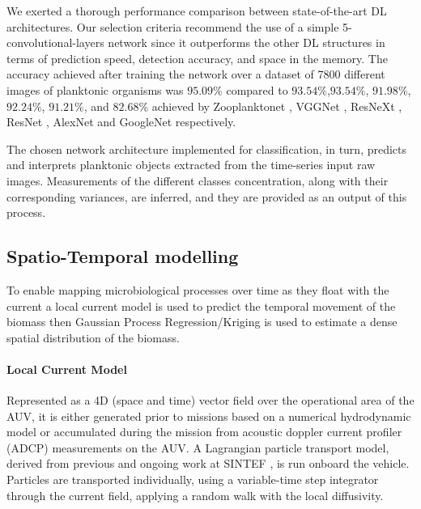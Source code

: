 \documentclass[conference]{IEEEtran}
\begin{document}
We exerted a thorough performance comparison between state-of-the-art
DL architectures. Our selection criteria recommend the use of a simple
5-convolutional-layers network since it outperforms the other DL
structures in terms of prediction speed, detection accuracy, and space
in the memory. The accuracy achieved after training the network over a
dataset of 7800 different images of planktonic organisms was $95.09\%$
compared to $93.54\%$,$93.54\%$, $91.98\%$, $92.24\%$, $91.21\%$, and
$82.68\%$ achieved by Zooplanktonet \cite{dai2016zooplanktonet},
VGGNet \cite{simonyan2014very}, ResNeXt \cite{xie2017aggregated},
ResNet \cite{he2016deep}, AlexNet \cite{krizhevsky2012imagenet} and
GoogleNet \cite{szegedy2015going} respectively.

The chosen network architecture implemented for classification, in
turn, predicts and interprets planktonic objects extracted from the
time-series input raw images. Measurements of the different classes
concentration, along with their corresponding variances, are inferred,
and they are provided as an output of this process.

\subsection{Spatio-Temporal modelling}
To enable mapping microbiological processes over time as they float
with the current a local current model is used to predict the temporal
movement of the biomass then Gaussian Process Regression/Kriging is
used to estimate a dense spatial distribution of the biomass.

\paragraph{Local Current Model}
Represented as a 4D (space and time) vector field over the operational
area of the AUV, it is either generated prior to missions based on a
numerical hydrodynamic model
or accumulated during the mission from acoustic doppler current
profiler (ADCP) measurements on the AUV.  A Lagrangian particle
transport model, derived from previous and ongoing work at SINTEF
\cite{Rye2006}, is run onboard the vehicle.  Particles are transported
individually, using a variable-time step
integrator %
through the current field, applying a random walk with the local
diffusivity.
\end{document}
